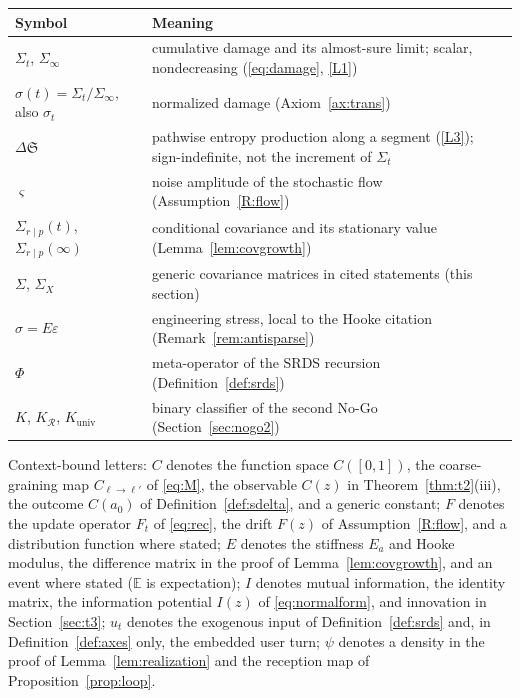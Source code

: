 \documentclass[11pt]{article}
\theoremstyle{plain}
\theoremstyle{definition}
\theoremstyle{remark}
\newcommand{\E}{\mathbb{E}}
\newcommand{\Sep}{\mathfrak{S}}
\newcommand{\Sst}{\Sigma_{r\mid p}(\infty)}
\begin{document}
\begin{center}
\begin{tabular}{@{}l p{9.2cm}@{}}
\hline
Symbol & Meaning \\
\hline
$\Sigma_t$, $\Sigma_\infty$ & cumulative damage and its almost-sure limit; scalar, nondecreasing (\eqref{eq:damage}, \ref{L1}) \\
$\sigma(t)=\Sigma_t/\Sigma_\infty$, also $\sigma_t$ & normalized damage (Axiom~\ref{ax:trans}) \\
$\Delta\Sep$ & pathwise entropy production along a segment (\ref{L3}); sign-indefinite, not the increment of $\Sigma_t$ \\
$\varsigma$ & noise amplitude of the stochastic flow (Assumption~\ref{R:flow}) \\
$\Sigma_{r\mid p}(t)$, $\Sst$ & conditional covariance and its stationary value (Lemma~\ref{lem:covgrowth}) \\
$\Sigma$, $\Sigma_X$ & generic covariance matrices in cited statements (this section) \\
$\sigma=E\varepsilon$ & engineering stress, local to the Hooke citation (Remark~\ref{rem:antisparse}) \\
$\Phi$ & meta-operator of the SRDS recursion (Definition~\ref{def:srds}) \\
$K$, $K_{\mathcal R}$, $K_{\mathrm{univ}}$ & binary classifier of the second No-Go (Section~\ref{sec:nogo2}) \\
\hline
\end{tabular}
\end{center}

Context-bound letters: $C$ denotes the function space $C([0,1])$, the coarse-graining map $C_{\ell\to\ell'}$ of \eqref{eq:M}, the observable $C(z)$ in Theorem~\ref{thm:t2}(iii), the outcome $C(a_0)$ of Definition~\ref{def:sdelta}, and a generic constant; $F$ denotes the update operator $F_t$ of \eqref{eq:rec}, the drift $F(z)$ of Assumption~\ref{R:flow}, and a distribution function where stated; $E$ denotes the stiffness $E_a$ and Hooke modulus, the difference matrix in the proof of Lemma~\ref{lem:covgrowth}, and an event where stated ($\E$ is expectation); $I$ denotes mutual information, the identity matrix, the information potential $I(z)$ of \eqref{eq:normalform}, and innovation in Section~\ref{sec:t3}; $u_t$ denotes the exogenous input of Definition~\ref{def:srds} and, in Definition~\ref{def:axes} only, the embedded user turn; $\psi$ denotes a density in the proof of Lemma~\ref{lem:realization} and the reception map of Proposition~\ref{prop:loop}.
\end{document}
